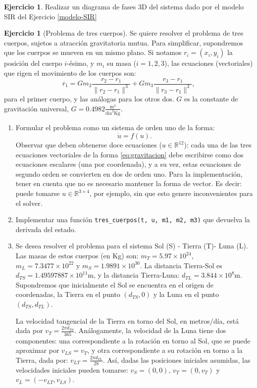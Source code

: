 \documentclass[12pt, a4paper]{amsbook}
\newcommand{\R}{{\mathbb R}}
\theoremstyle{remark}
\theoremstyle{definition}
\newtheorem{ejer}[teo]{Ejercicio}
\numberwithin{section}{chapter}
\numberwithin{subsection}{section}
\numberwithin{equation}{section}
\numberwithin{figure}{chapter}
\begin{document}
\begin{ejer} Realizar un diagrama de fases 3D del sistema dado por el modelo SIR del Ejercicio \ref{modelo-SIR}\end{ejer}


\begin{ejer}[Problema de tres cuerpos]
Se quiere resolver el problema de tres cuerpos, sujetos a atracción gravitatoria mutua. Para simplificar, supondremos que los cuerpos se mueven en un mismo plano. Si notamos $r_i = (x_i,y_i)$ la posición del cuerpo $i$-ésimo, y $m_i$ su masa ($i=1,2,3$), las ecuaciones (vectoriales) que rigen el movimiento de los cuerpos son:
\begin{equation}\label{eq:gravitacion}
\ddot{r_1} = G m_2 \frac{r_2-r_1}{\|r_2-r_1\|^3}+G m_3\frac{r_3-r_1}{\|r_3-r_1\|^3},
\end{equation}
para el primer cuerpo, y las análogas para los otros dos. $G$ es la constante de gravitación universal, $G=0.4982 \frac{\textrm{m}^3}{\textrm{dia}^2\textrm{Kg}}$. 
\begin{enumerate}
\item Formular el problema como un sistema de orden uno de la forma: 
$$\dot{u}=f(u).$$
Observar que deben obtenerse doce ecuaciones ($u\in\R^{12}$): cada una de las tres ecuaciones vectoriales de la forma \eqref{eq:gravitacion} debe escribirse como dos ecuaciones escalares (una por coordenada), y a su vez, estas ecuaciones de segundo orden se convierten en dos de orden uno. Para la implementación, tener en cuenta que no es necesario mantener la forma de vector. Es decir: puede tomarse $u\in\R^{3\times 4}$, por ejemplo, sin que esto genere inconvenientes para el solver.
\item Implementar una función \lstinline{tres_cuerpos(t, u, m1, m2, m3)} que devuelva la derivada del estado. 
\item Se desea resolver el problema para el sistema Sol (S) - Tierra (T)- Luna (L). Las masas de estos cuerpos (en Kg) son: $m_T = 5.97\times 10^{24}$, $m_L = 7.3477\times10^{22}$ y $m_S = 1.9891\times10^{30}$. La distancia Tierra-Sol es $d_{TS} = 1.49597887\times10^{11}$m, y la distancia Tierra-Luna: $d_{TL} = 3.844\times 10^8$m. Supondremos que inicialmente el Sol se encuentra en el origen de coordenadas, la Tierra en el punto $(d_{TS},0)$ y la Luna en el punto $(d_{TS},d_{TL})$. 

La velocidad tangencial de la Tierra en torno del Sol, en metros/día, está dada por $v_T=\frac{2\pi d_{TS}}{365}$. Análogamente, la velocidad de la Luna tiene dos componentes: una corres\-pondiente a la rotación en torno al Sol, que se puede aproximar por $v_{LS} = v_T$, y otra correspondiente a su rotación en torno a la Tierra, dada por: $v_{LT}=\frac{2\pi d_{TL}}{28}$. Así, dadas las posiciones iniciales asumidas, las velocidades iniciales pueden tomarse: $v_S=(0,0)$, $v_T = (0,v_T)$ y $v_L = (-v_{LT},v_{LS})$. 


\end{enumerate}
\end{ejer}
\end{document}
